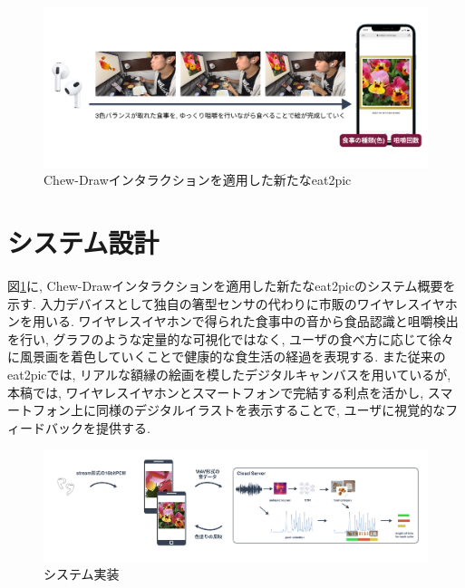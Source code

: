 \begin{figure}[t]
    \begin{center}
        \includegraphics[clip, width=1.0\hsize]{img/chew-draw-eat2pic-system.png}
        \caption{Chew-Drawインタラクションを適用した新たなeat2pic}
        \label{fig:chew-draw-eat2pic-system}
    \end{center}
\end{figure}

\section{システム設計}

図\ref{fig:chew-draw-eat2pic-system}に, Chew-Drawインタラクションを適用した新たなeat2picのシステム概要を示す. 入力デバイスとして独自の箸型センサの代わりに市販のワイヤレスイヤホンを用いる. ワイヤレスイヤホンで得られた食事中の音から食品認識と咀嚼検出を行い, グラフのような定量的な可視化ではなく, ユーザの食べ方に応じて徐々に風景画を着色していくことで健康的な食生活の経過を表現する. また従来のeat2picでは, リアルな額縁の絵画を模したデジタルキャンバスを用いているが, 本稿では, ワイヤレスイヤホンとスマートフォンで完結する利点を活かし, スマートフォン上に同様のデジタルイラストを表示することで, ユーザに視覚的なフィードバックを提供する.

\begin{figure}[t]
    \begin{center}
        \includegraphics[clip, width=1.0\hsize]{img/eat2pic-impl.png}
        \caption{システム実装}
        \label{fig:eat2pic-impl}
    \end{center}
\end{figure}

